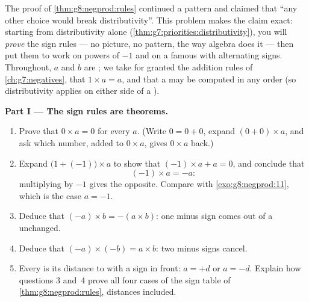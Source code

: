 \begin{problem}
\label{pb:g8:negprod:1}
The proof of \cref{thm:g8:negprod:rules} continued a pattern and
claimed that ``any other choice would break distributivity''. This
problem makes the claim exact: starting from distributivity alone
(\cref{thm:g7:priorities:distributivity}), you will \emph{prove} the
sign rules --- no picture, no pattern, the way algebra does it ---
then put them to work on powers of $-1$ and on a famous  with
alternating signs. Throughout, $a$ and $b$ are ; we
take for granted the addition rules of \cref{ch:g7:negatives}, that
$1 \times a = a$, and that a  may be computed in any order
(so distributivity applies on either side of a ).

\medskip
\noindent\textbf{Part I --- The sign rules are theorems.}
\begin{enumerate}
  \item Prove that $0 \times a = 0$ for every  $a$.
        (Write $0 = 0 + 0$, expand $(0 + 0) \times a$, and ask which
        number, added to $0 \times a$, gives $0 \times a$ back.)
  \item Expand $\bigl(1 + (-1)\bigr) \times a$ to show that
        $(-1) \times a + a = 0$, and conclude that
        \[
        (-1) \times a = -a :
        \]
        multiplying by $-1$ gives the opposite. Compare with
        \cref{exo:g8:negprod:11}, which is the case $a = -1$.
  \item Deduce that $(-a) \times b = -(a \times b)$: one minus sign
        comes out of a  unchanged.
  \item Deduce that $(-a) \times (-b) = a \times b$: two minus signs
        cancel.
  \item Every  is its distance to  with a sign in
        front: $a = +d$ or $a = -d$. Explain how questions 3 and~4
        prove all four cases of the sign table of
        \cref{thm:g8:negprod:rules}, distances included.
\end{enumerate}


\end{problem}
